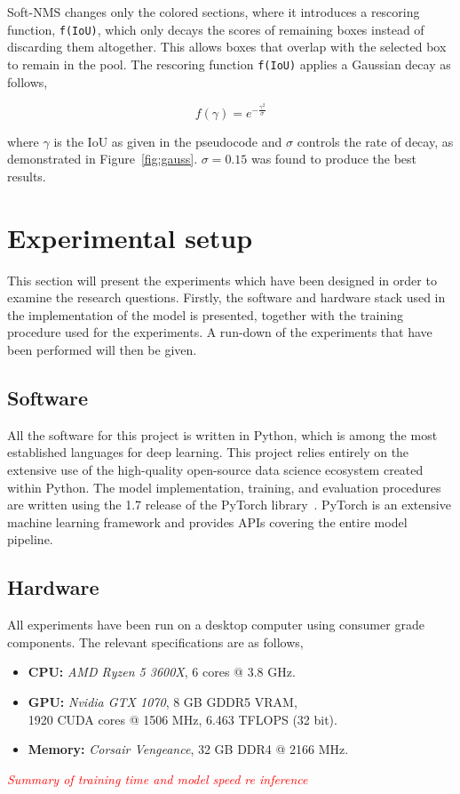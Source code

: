Soft-NMS changes only the colored sections, where it introduces a rescoring function, \texttt{f(IoU)}, which only decays the scores of remaining boxes instead of discarding them altogether. %
This allows boxes that overlap with the selected box to remain in the pool.
The rescoring function \texttt{f(IoU)} applies a Gaussian decay as follows, %

\[f(\gamma) = e^{-\frac{{\gamma}^2}{\sigma}}\]

where \(\gamma \) is the IoU as given in the pseudocode and \( \sigma \) controls the rate of decay, as demonstrated in Figure~\ref{fig:gauss}. \(\sigma=0.15\) was found to produce the best results.

\section{Experimental setup}\label{sec:method-exp-setup}
This section will present the experiments which have been designed in order to examine the research questions.
Firstly, the software and hardware stack used in the implementation of the model is presented, together with the training procedure used for the experiments.
A run-down of the experiments that have been performed will then be given.

\subsection{Software}
All the software for this project is written in Python, which is among the most established languages for deep learning.
This project relies entirely on the extensive use of the high-quality open-source data science ecosystem created within Python.
The model implementation, training, and evaluation procedures are written using the 1.7 release of the PyTorch library\ \parencite{NEURIPS2019_9015}.
PyTorch is an extensive machine learning framework and provides APIs covering the entire model pipeline.

\subsection{Hardware}
All experiments have been run on a desktop computer using consumer grade components.
The relevant specifications are as follows,
\begin{itemize}
  \item \textbf{CPU:} \textit{AMD Ryzen 5 3600X}, 6 cores @ 3.8 GHz.
  \item \textbf{GPU:} \textit{Nvidia GTX 1070}, 8 GB GDDR5 VRAM,\\1920 CUDA cores @ 1506 MHz, 6.463 TFLOPS (32 bit).
  \item \textbf{Memory:} \textit{Corsair Vengeance}, 32 GB DDR4 @ 2166 MHz.
\end{itemize}
{\it
\textcolor{red}{Summary of training time and model speed re inference}
}
